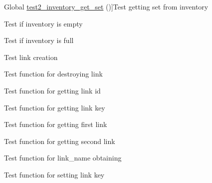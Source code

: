 \begin{DoxyRefList}
\hypertarget{test__test000008}{}%
Global \hyperlink{inventory__test_8c_a66737b763a088f8a85549e846b01fbdb}{test2\+\_\+inventory\+\_\+get\+\_\+set} ()]Test getting set from inventory  
\item[\label{test__test000018}%
\hypertarget{test__test000018}{}%
Global \hyperlink{inventory__test_8c_a4d2a2a4d4ba59446d013debfe9bf05dc}{test2\+\_\+inventory\+\_\+is\+\_\+empty} ()]Test if inventory is empty  
\item[\label{test__test000016}%
\hypertarget{test__test000016}{}%
Global \hyperlink{inventory__test_8c_a1c9e567d4919d5aaccc9580815a8a81d}{test2\+\_\+inventory\+\_\+is\+\_\+full} ()]Test if inventory is full  
\item[\label{test__test000023}%
\hypertarget{test__test000023}{}%
Global \hyperlink{link__test_8c_a24b5463da176c3e578b0a0fa8bb1f9f0}{test2\+\_\+link\+\_\+create} ()]Test link creation  
\item[\label{test__test000042}%
\hypertarget{test__test000042}{}%
Global \hyperlink{link__test_8c_afae7294e1213cade145448511cfae536}{test2\+\_\+link\+\_\+destroy} ()]Test function for destroying link  
\item[\label{test__test000040}%
\hypertarget{test__test000040}{}%
Global \hyperlink{link__test_8c_a0f967a1782dd7264e73ad428d22d125d}{test2\+\_\+link\+\_\+get\+\_\+id} ()]Test function for getting link id  
\item[\label{test__test000048}%
\hypertarget{test__test000048}{}%
Global \hyperlink{link__test_8c_abae02eb503ca35d9198dd4cb2f1c8d5e}{test2\+\_\+link\+\_\+get\+\_\+key} ()]Test function for getting link key  
\item[\label{test__test000036}%
\hypertarget{test__test000036}{}%
Global \hyperlink{link__test_8c_a7e180eb974324d38e9bec8bada8d2f7a}{test2\+\_\+link\+\_\+get\+\_\+link1} ()]Test function for getting first link  
\item[\label{test__test000038}%
\hypertarget{test__test000038}{}%
Global \hyperlink{link__test_8c_ab74179d7a6e4ceff70117cd20b82c95b}{test2\+\_\+link\+\_\+get\+\_\+link2} ()]Test function for getting second link  
\item[\label{test__test000034}%
\hypertarget{test__test000034}{}%
Global \hyperlink{link__test_8c_a4efc6cfcdc210e2803f9d285734c571e}{test2\+\_\+link\+\_\+get\+\_\+name} ()]Test function for link\+\_\+name obtaining  
\item[\label{test__test000045}%
\hypertarget{test__test000045}{}%
Global \hyperlink{link__test_8c_a502c73e4043204f9fa22f744506bf4e9}{test2\+\_\+link\+\_\+set\+\_\+key} ()]Test function for setting link key  

\end{DoxyRefList}
